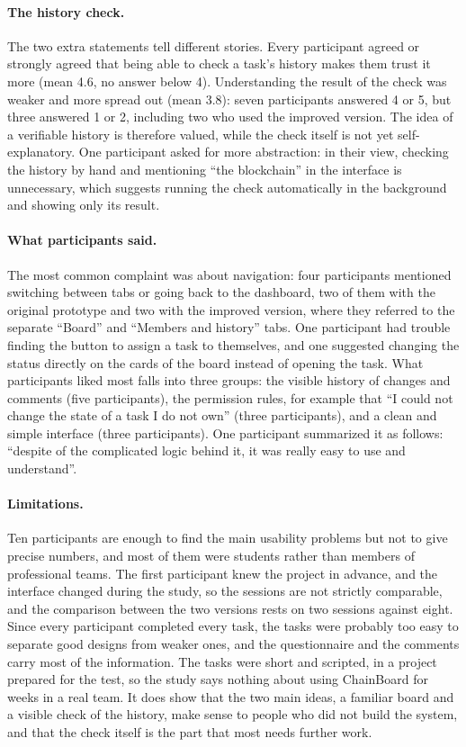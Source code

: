 \paragraph*{The history check.} The two extra statements tell different stories. Every participant agreed or strongly agreed that being able to check a task's history makes them trust it more (mean 4.6, no answer below 4). Understanding the result of the check was weaker and more spread out (mean 3.8): seven participants answered 4 or 5, but three answered 1 or 2, including two who used the improved version. The idea of a verifiable history is therefore valued, while the check itself is not yet self-explanatory. One participant asked for more abstraction: in their view, checking the history by hand and mentioning ``the blockchain'' in the interface is unnecessary, which suggests running the check automatically in the background and showing only its result.

\paragraph*{What participants said.} The most common complaint was about navigation: four participants mentioned switching between tabs or going back to the dashboard, two of them with the original prototype and two with the improved version, where they referred to the separate ``Board'' and ``Members and history'' tabs. One participant had trouble finding the button to assign a task to themselves, and one suggested changing the status directly on the cards of the board instead of opening the task. What participants liked most falls into three groups: the visible history of changes and comments (five participants), the permission rules, for example that ``I could not change the state of a task I do not own'' (three participants), and a clean and simple interface (three participants). One participant summarized it as follows: ``despite of the complicated logic behind it, it was really easy to use and understand''.

\paragraph*{Limitations.} Ten participants are enough to find the main usability problems but not to give precise numbers, and most of them were students rather than members of professional teams. The first participant knew the project in advance, and the interface changed during the study, so the sessions are not strictly comparable, and the comparison between the two versions rests on two sessions against eight. Since every participant completed every task, the tasks were probably too easy to separate good designs from weaker ones, and the questionnaire and the comments carry most of the information. The tasks were short and scripted, in a project prepared for the test, so the study says nothing about using ChainBoard for weeks in a real team. It does show that the two main ideas, a familiar board and a visible check of the history, make sense to people who did not build the system, and that the check itself is the part that most needs further work.
